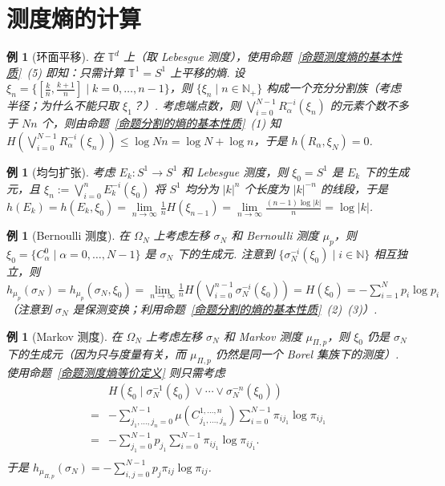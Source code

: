 \documentclass[11pt, a4paper, oneside]{ctexart}
\newtheorem{example}[theorem]{例}
\newcommand{\N}{\mathbb{N}}
\newcommand{\T}{\mathbb{T}}
\newcommand{\abs}[1]{\left|{#1}\right|}
\begin{document}
    \section{测度熵的计算}
    \begin{example}[环面平移]
        在 $\T^d$ 上（取 Lebesgue 测度），使用命题~\ref{命题测度熵的基本性质}~(5) 即知：只需计算 $\T^1=S^1$ 上平移的熵. 设 $\xi_n=\{[\frac{k}{n},\frac{k+1}{n}]\mid k=0,\ldots,n-1\}$，则 $\{\xi_n\mid n\in\N_+\}$ 构成一个充分分割族（考虑半径；为什么不能只取 $\xi_1$？）. 考虑端点数，则 $\bigvee\limits_{i=0}^{N-1}R_{\alpha}^{-i}(\xi_n)$ 的元素个数不多于 $Nn$ 个，则由命题~\ref{命题分割的熵的基本性质}~(1) 知 $H(\bigvee\limits_{i=0}^{N-1}R_{\alpha}^{-i}(\xi_n))\leq \log Nn=\log N+\log n$，于是 $h(R_{\alpha},\xi_N)=0$.
    \end{example}

    \begin{example}[均匀扩张]
        考虑 $E_k:S^1\to S^1$ 和 Lebesgue 测度，则 $\xi_0=S^1$ 是 $E_k$ 下的生成元，且 $\xi_n:=\bigvee\limits_{i=0}^{n}E_k^{-i}(\xi_0)$ 将 $S^1$ 均分为 $\abs{k}^{n}$ 个长度为 $\abs{k}^{-n}$ 的线段，于是 $h(E_k)=h(E_k,\xi_0)=\lim\limits_{n\to\infty}\frac{1}{n}H(\xi_{n-1})=\lim\limits_{n\to\infty}\frac{(n-1)\log\abs{k}}{n}=\log\abs{k}$.
    \end{example}

    \begin{example}[Bernoulli 测度]
        在 $\Omega_N$ 上考虑左移 $\sigma_N$ 和 Bernoulli 测度 $\mu_p$，则 $\xi_0=\{C_{\alpha}^0\mid \alpha=0,\ldots,N-1\}$ 是 $\sigma_N$ 下的生成元. 注意到 $\{\sigma_N^{-i}(\xi_0)\mid i\in\N\}$ 相互独立，则 $h_{\mu_p}(\sigma_N)=h_{\mu_p}(\sigma_N,\xi_0)=\lim\limits_{n\to\infty}\frac{1}{n}H(\bigvee\limits_{i=0}^{n-1}\sigma_N^{-i}(\xi_0))=H(\xi_0)=-\sum\limits_{i=1}^{N}p_i\log p_i$（注意到 $\sigma_N$ 是保测变换；利用命题~\ref{命题分割的熵的基本性质}~(2)~(3)）.
    \end{example}

    \begin{example}[Markov 测度]
        在 $\Omega_N$ 上考虑左移 $\sigma_N$ 和 Markov 测度 $\mu_{\Pi,p}$，则 $\xi_0$ 仍是 $\sigma_N$ 下的生成元（因为只与度量有关，而 $\mu_{\Pi,p}$ 仍然是同一个 Borel 集族下的测度）. 使用命题~\ref{命题测度熵等价定义} 则只需考虑
        \begin{equation*}
            \begin{aligned}
                &H(\xi_0\mid \sigma_N^{-1}(\xi_0)\vee\cdots\vee\sigma_N^{-n}(\xi_0))\\
                =&-\sum\limits_{j_1,\ldots,j_n=0}^{N-1}\mu(C_{j_1,\ldots,j_n}^{1,\ldots,n})\sum\limits_{i=0}^{N-1}\pi_{ij_1}\log\pi_{ij_1}\\
                =&-\sum\limits_{j_1=0}^{N-1}p_{j_1}\sum\limits_{i=0}^{N-1}\pi_{ij_1}\log\pi_{ij_1}.\\
            \end{aligned}
        \end{equation*}
        于是 $h_{\mu_{\Pi,p}}(\sigma_N)=-\sum\limits_{i,j=0}^{N-1}p_j\pi_{ij}\log\pi_{ij}$.
    \end{example}
\end{document}
